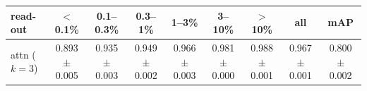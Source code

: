 \begin{tabular}{lcccccccc}
\toprule
read-out & $<$0.1\% & 0.1--0.3\% & 0.3--1\% & 1--3\% & 3--10\% & $>$10\% & all & mAP \\
\midrule
attn ($k=3$) & 0.893 $\pm$ 0.005 & 0.935 $\pm$ 0.003 & 0.949 $\pm$ 0.002 & 0.966 $\pm$ 0.003 & 0.981 $\pm$ 0.000 & 0.988 $\pm$ 0.001 & 0.967 $\pm$ 0.001 & 0.800 $\pm$ 0.002 \\
\bottomrule
\end{tabular}
